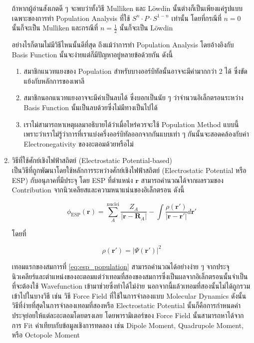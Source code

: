 \begin{enumerate}[topsep=0pt,noitemsep]
          ถ้าหากผู้อ่านสังเกตดี ๆ จะพบว่าทั้งวิธี Mulliken และ L\"{o}wdin นั้นต่างก็เป็นเพียงแค่รูปแบบเฉพาะของการทำ Population Analysis ที่ใช้ $S^{n} \cdot P \cdot S^{1-n}$ เท่านั้น โดยที่กรณีที่ $n=0$ นั้นก็จะเป็น Mulliken และกรณีที่ $n=\frac{1}{2}$ นั้นก็จะเป็น L\"{o}wdin

          อย่างไรก็ตามไม่มีวิธีไหนนั้นดีที่สุด ถึงแม้ว่าการทำ Population Analysis โดยอ้างอิงกับ Basis Function นั้นจะง่ายแต่ก็มีปัญหาอยู่หลายข้อด้วยกัน ดังนี้
          \begin{enumerate}[topsep=0pt,noitemsep]\setlength\itemsep{0.5em}
              \item สมาชิกแนวทแยงของ Population สำหรับบางออร์บิทัลนั้นอาจจะมีค่ามากกว่า 2 ได้ ซึ่งขัดแย้งกับหลักการของเพาลี

              \item สมาชิกนอกแนวทแยงอาจจะมีค่าเป็นลบได้ ซึ่งบอกเป็นนัย ๆ ว่าจำนวนอิเล็กตรอนระหว่าง Basis Function นั้นเป็นลบด้วยซึ่งไม่มีทางเป็นไปได้

              \item เราไม่สามารถหาเหตุผลมาอธิบายได้ว่าเมื่อไหร่ควรจะใช้ Population Method แบบนี้เพราะว่าเราไม่รู้ว่าการที่เราแบ่งครึ่งออร์บิทัลออกจากกันแบบเท่า ๆ กันนั้นจะสอดคล้องกับค่า Electronegativity ของอะตอมด้วยหรือไม่
          \end{enumerate}

    \item วิธีที่ใช้ศักย์เชิงไฟฟ้าสถิตย์ (Electrostatic Potential-based) \\

          เป็นวิธีที่ถูกพัฒนาโดยใช้หลักการระหว่างศักย์เชิงไฟฟ้าสถิตย์ (Electrostatic Potential หรือ ESP) กับอนุภาคที่มีประจุ โดย ESP ที่ตำแหน่ง $\bm{r}$ สามารถคำนวณได้จากผลรวมของ Contribution จากนิวเคลียสและความหนาแน่นของอิเล็กตรอน ดังนี้

          \begin{equation}\label{eq:esp_population}
              \phi_{\text{ESP}}(\bm{r}) = \sum^{\text{nuclei}}_{A} \frac{Z_{A}}{|\bm{r} - \bm{R}_{A}|}
              - \int \frac{\rho(\bm{r}')}{|\bm{r} - \bm{r}'|} d\bm{r}'
          \end{equation}

          \noindent โดยที่

          \begin{equation}
              \rho(\bm{r}') = |\Psi(\bm{r}')|^{2}
          \end{equation}

          เทอมแรกของสมการที่ \eqref{eq:esp_population} สามารถคำนวณได้อย่างง่าย ๆ จากประจุนิวเคลียร์และตำแหน่งของอะตอมแต่ว่าเทอมที่สองของสมการซึ่งเป็นผลจากอิเล็กตรอนนั้นจำเป็นที่จะต้องใช้ Wavefunction เข้ามาช่วยซึ่งทำได้ไม่ง่าย นอกจากนี้แล้วเทอมที่สองนั้นไม่ได้ถูกรวมเข้าไปในบางวิธี เช่น วิธี Force Field ที่ใช้ในการจำลองแบบ Molecular Dynamics ดังนั้นวิธีที่ง่ายที่สุดในการจำลองเทอมที่สองหรือ Electrostatic Potential นั้นก็คือการกำหนดค่าประจุย่อยให้แต่ละอะตอมโดยตรงเลย โดยพารามิเตอร์ของ Force Field นั้นสามารถหาได้จากการ Fit ค่าเทียบกับข้อมูลเชิงการทดลอง เช่น Dipole Moment, Quadrupole Moment, หรือ Octopole Moment


\end{enumerate}
